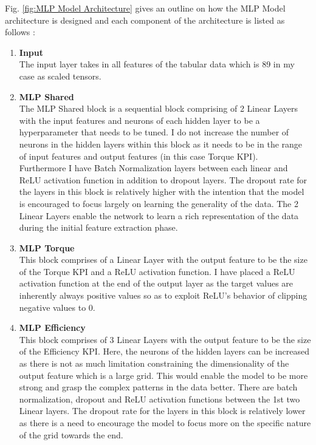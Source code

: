 \documentclass{report} %
\begin{document}
Fig. \ref{fig:MLP Model Architecture} gives an outline on how the \ac{MLP} Model architecture is designed and each component of the architecture is listed as follows :
\begin{enumerate}
    \item \textbf{Input} \\
    The input layer takes in all features of the tabular data which is 89 in my case as scaled tensors.
    \item \textbf{MLP Shared} \\
    The MLP Shared block is a sequential block comprising of 2 Linear Layers with the input features and neurons of each hidden layer to be a hyperparameter that needs to be tuned.
    I do not increase the number of neurons in the hidden layers within this block as it needs to be in the range of input features and output features (in this case Torque \ac{KPI}).\\
    Furthermore I have Batch Normalization layers between each linear and \ac{ReLU} activation function in addition to dropout layers.
    The dropout rate for the layers in this block is relatively higher with the intention that the model is encouraged to focus largely on learning the generality of the data.
    The 2 Linear Layers enable the network to learn a rich representation of the data during the initial feature extraction phase.
    \item \textbf{MLP Torque} \\
    This block comprises of a Linear Layer with the output feature to be the size of the Torque \ac{KPI} and a \ac{ReLU} activation function.
    I have placed a \ac{ReLU} activation function at the end of the output layer as the target values are inherently always positive values so as to exploit 
    \ac{ReLU}'s behavior of clipping negative values to 0.
    \item \textbf{MLP Efficiency} \\
    This block comprises of 3 Linear Layers with the output feature to be the size of the Efficiency \ac{KPI}.
    Here, the neurons of the hidden layers can be increased as there is not as much limitation constraining the dimensionality of the output feature which is a large grid.
    This would enable the model to be more strong and grasp the complex patterns in the data better.
    There are batch normalization, dropout and \ac{ReLU} activation functions between the 1st two Linear layers.
    The dropout rate for the layers in this block is relatively lower as there is a need to encourage the model to focus more on the specific nature of the grid towards the end.

\end{enumerate}
\end{document}
